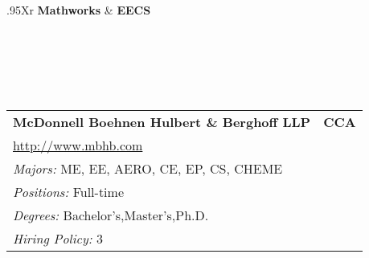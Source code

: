 \documentclass[twoside]{article}
\begin{document}
\begin{center}
\begin{multicols}{3}
\begin{FlushLeft}
\begin{minipage}{\columnwidth}
\end{minipage}
 
\begin{minipage}{\columnwidth}\begin{tabularx}{.95\columnwidth}{Xr}
                 {\Large\bf Mathworks} & {\Large\bf EECS}\\
    \\
    \\
    \\
    \\
    \\
    \end{tabularx}
    
\end{minipage}
 
\begin{minipage}{\columnwidth}\begin{tabularx}{.95\columnwidth}{Xr}
                 {\Large\bf McDonnell Boehnen Hulbert \& Berghoff LLP} & {\Large\bf CCA}\\
    \multicolumn{2}{p{.95\columnwidth}}{\url{http://www.mbhb.com}}\\
    \multicolumn{2}{p{.95\columnwidth}}{\emph{Majors:} ME, EE, AERO, CE, EP, CS, CHEME}\\
    \multicolumn{2}{p{.95\columnwidth}}{\emph{Positions:} Full-time}\\
    \multicolumn{2}{p{.95\columnwidth}}{\emph{Degrees:} Bachelor's,Master's,Ph.D.}\\
    \multicolumn{2}{p{.95\columnwidth}}{\emph{Hiring Policy:} 3}\\
    \end{tabularx}
    
\end{minipage}
 

\end{FlushLeft}
\end{multicols}
\end{center}
\end{document}
